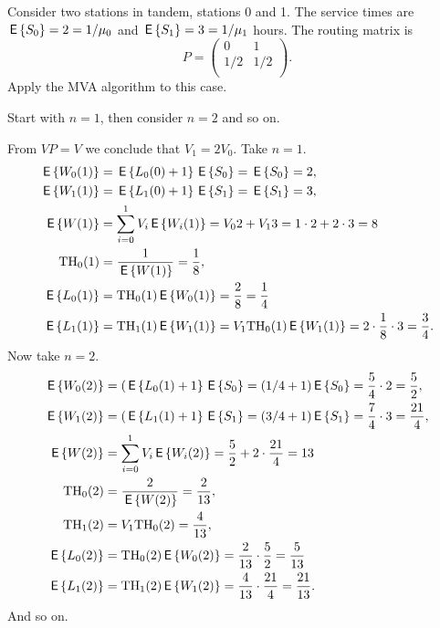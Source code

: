 \begin{exercise}\label{ex:mva_numerical}
  Consider two stations in tandem, stations 0 and 1. The service times
  are $\E{ S_0} = 2=1/\mu_0$ and $\E{ S_1} = 3=1/\mu_1$ hours. The routing matrix is
  \begin{equation*}
    P=
    \begin{pmatrix}
      0 & 1\\
1/2 & 1/2\\
    \end{pmatrix}.
  \end{equation*}
Apply the MVA algorithm to this case.
\begin{hint}
Start with $n=1$, then consider $n=2$ and so on.
\end{hint}
\begin{solution}
  From $V P = V$ we conclude that $V_1=2V_0$.  Take $n=1$.
  \begin{align*}
\E{ W_0(1)} &= \E{ L_0(0)+1}\E{ S_0} = \E{ S_0 }= 2,\\
 \E{ W_1(1)} &= \E{ L_1(0)+1}\E{ S_1} = \E{ S_1} = 3,\\
 \E{ W(1)} &= \sum_{i=0}^1 V_i \E{ W_i(1)} = V_0 2 + V_1  3 = 1\cdot 2 + 2 \cdot 3 = 8\\
 \TH_0(1) &= \frac{1}{\E{ W(1)}} = \frac18, \\
 \E{ L_0(1)} &= \TH_0(1) \E{ W_0(1)} = \frac28=\frac14 \\
 \E{ L_1(1)} &= \TH_1(1) \E{ W_1(1)} = V_1 \TH_0(1) \E{ W_1(1)}= 2 \cdot \frac18 \cdot 3 = \frac34.\\
  \end{align*}
Now take $n=2$.     
  \begin{align*}
\E{ W_0(2) }&= (\E{ L_0(1)+1}\E{ S_0}= (1/4+1)\E{ S_0} = \frac54\cdot2=\frac52,\\
\E{ W_1(2) }&= (\E{ L_1(1)+1}\E{ S_1} = (3/4+1)\E{ S_1} = \frac74\cdot3=\frac{21}4,\\
\E{ W(2) }&= \sum_{i=0}^1 V_i \E{ W_i(2)} = \frac52 + 2 \cdot \frac{21}4=13\\
\TH_0(2) &= \frac{2}{\E{ W(2)}} = \frac2{13}, \\
\TH_1(2) &= V_1 \TH_0(2) = \frac4{13}, \\
\E{ L_0(2)} &= \TH_0(2) \E{ W_0(2)} = \frac2{13}\cdot \frac52=\frac5{13} \\
\E{ L_1(2)} &= \TH_1(2) \E{ W_1(2)} = \frac{4}{13} \cdot \frac{21}{4} = \frac{21}{13}.\\
  \end{align*}
And so on.
\end{solution}
\end{exercise}


